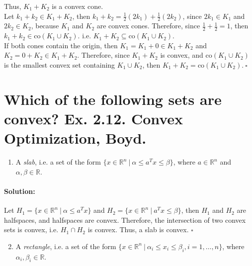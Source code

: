 \documentclass[10pt]{article}
\begin{document}
Thus, $K_1 + K_2$ is a convex cone.\\

Let $k_{1} + k_{2} \in K_1 + K_2$, then $k_{1} + k_{2} = \frac{1}{2} (2 k_{1}) + \frac{1}{2}(2 k_{2})$, since $2 k_{1} \in K_1$ and $2 k_{2} \in K_2$, because $K_1$ and $K_2$ are convex cones. Therefore, since $\frac{1}{2} + \frac{1}{2} = 1$, then $k_{1} + k_{2} \in \text{co}(K_1 \cup K_2)$. i.e. $K_1 + K_2 \subseteq \text{co}(K_1 \cup K_2)$.\\

If both cones contain the origin, then $K_1 = K_1 + 0 \in K_1 + K_2$ and $K_2 = 0 + K_2 \in K_1 + K_2$. Therefore, since $K_1 + K_2$ is convex, and $\text{co}(K_1 \cup K_2)$ is the smallest convex set containing $K_1 \cup K_2$, then $K_1 + K_2 = \text{co}(K_1 \cup K_2). \ \square$

\hfill \break %

\setcounter{section}{2}

\section{Which of the following sets are convex? Ex. 2.12. Convex Optimization, Boyd.}


\begin{enumerate}[label=(\alph*)]
  \item A \textit{slab}, i.e. a set of the form $\{x \in \mathbb{R}^n \ | \ \alpha \leq a^Tx \leq \beta\}$, where $a \in \mathbb{R}^n$ and $\alpha, \beta \in \mathbb{R}$.
\end{enumerate}

\paragraph{Solution:}


Let $H_1 = \{x \in \mathbb{R}^n \ | \ \alpha \leq a^Tx \}$ and $H_2 = \{x \in \mathbb{R}^n \ | \ a^Tx \leq \beta\}$, then $H_1$ and $H_2$ are halfspaces, and halfspaces are convex. Therefore, the intersection of two convex sets is convex, i.e. $H_1 \cap H_2$ is convex. Thus, a slab is convex. $\square$




\begin{enumerate}[label=(\alph*)]
  \setcounter{enumi}{1}
  \item A \textit{rectangle}, i.e. a set of the form $\{x \in \mathbb{R}^n \ | \ \alpha_i \leq x_i \leq \beta_i, i = 1, \dots, n\}$, where $\alpha_i, \beta_i \in \mathbb{R}$.
\end{enumerate}
\end{document}
